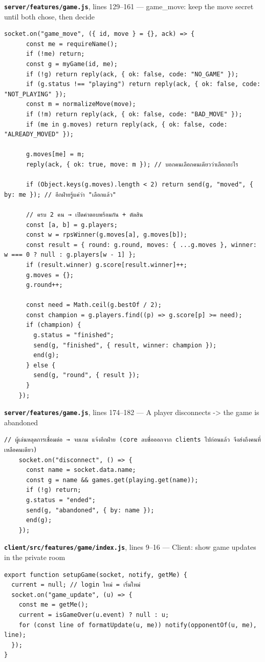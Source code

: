 \documentclass[11pt,a4paper]{article}
\newcommand{\code}[1]{\texttt{#1}}
\newcommand{\snap}[3]{\par\medskip\textbf{\code{#1}}, lines #2 --- #3}
\begin{document}
\snap{server/features/game.js}{129--161}{game\_move: keep the move secret until both chose, then decide}
\begin{Verbatim}[firstnumber=129]
    socket.on("game_move", ({ id, move } = {}, ack) => {
      const me = requireName();
      if (!me) return;
      const g = myGame(id, me);
      if (!g) return reply(ack, { ok: false, code: "NO_GAME" });
      if (g.status !== "playing") return reply(ack, { ok: false, code: "NOT_PLAYING" });
      const m = normalizeMove(move);
      if (!m) return reply(ack, { ok: false, code: "BAD_MOVE" });
      if (me in g.moves) return reply(ack, { ok: false, code: "ALREADY_MOVED" });

      g.moves[me] = m;
      reply(ack, { ok: true, move: m }); // บอกคนเลือกคนเดียวว่าเลือกอะไร

      if (Object.keys(g.moves).length < 2) return send(g, "moved", { by: me }); // อีกฝ่ายรู้แค่ว่า "เลือกแล้ว"

      // ครบ 2 คน → เปิดคำตอบพร้อมกัน + ตัดสิน
      const [a, b] = g.players;
      const w = rpsWinner(g.moves[a], g.moves[b]);
      const result = { round: g.round, moves: { ...g.moves }, winner: w === 0 ? null : g.players[w - 1] };
      if (result.winner) g.score[result.winner]++;
      g.moves = {};
      g.round++;

      const need = Math.ceil(g.bestOf / 2);
      const champion = g.players.find((p) => g.score[p] >= need);
      if (champion) {
        g.status = "finished";
        send(g, "finished", { result, winner: champion });
        end(g);
      } else {
        send(g, "round", { result });
      }
    });
\end{Verbatim}

\snap{server/features/game.js}{174--182}{A player disconnects -> the game is abandoned}
\begin{Verbatim}[firstnumber=174]
    // ผู้เล่นหลุดการเชื่อมต่อ → จบเกม แจ้งอีกฝ่าย (core ลบชื่อออกจาก clients ไปก่อนแล้ว จึงส่งถึงคนที่เหลือคนเดียว)
    socket.on("disconnect", () => {
      const name = socket.data.name;
      const g = name && games.get(playing.get(name));
      if (!g) return;
      g.status = "ended";
      send(g, "abandoned", { by: name });
      end(g);
    });
\end{Verbatim}

\snap{client/src/features/game/index.js}{9--16}{Client: show game updates in the private room}
\begin{Verbatim}[firstnumber=9]
export function setupGame(socket, notify, getMe) {
  current = null; // login ใหม่ = เริ่มใหม่
  socket.on("game_update", (u) => {
    const me = getMe();
    current = isGameOver(u.event) ? null : u;
    for (const line of formatUpdate(u, me)) notify(opponentOf(u, me), line);
  });
}
\end{Verbatim}
\end{document}
